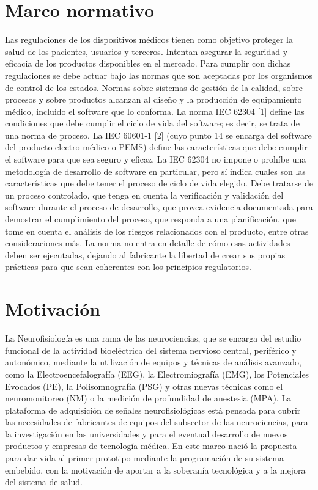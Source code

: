 \section{Marco normativo}
Las regulaciones de los dispositivos médicos tienen como objetivo proteger la salud de los pacientes, usuarios y terceros. Intentan asegurar la seguridad y eficacia de los productos disponibles en el mercado. Para cumplir con dichas regulaciones se debe actuar bajo las normas que son aceptadas por los organismos de control de los estados. Normas sobre sistemas de gestión de la calidad, sobre procesos y sobre productos alcanzan al diseño y la producción de equipamiento médico, incluido el software que lo conforma. La norma IEC 62304 [1] define las condiciones que debe cumplir el ciclo de vida del software; es decir, se trata de una norma de proceso. La IEC 60601-1 [2] (cuyo punto 14 se encarga del software del producto electro-médico o PEMS) define las características que debe cumplir el software para que sea seguro y eficaz. La IEC 62304 no impone o prohíbe una metodología de desarrollo de software en particular, pero sí indica cuales son las características que debe tener el proceso de ciclo de vida elegido. Debe tratarse de un proceso controlado, que tenga en cuenta la verificación y validación del software durante el proceso de desarrollo, que provea evidencia documentada para demostrar el cumplimiento del proceso, que responda a una planificación, que tome en cuenta el análisis de los riesgos relacionados con el producto, entre otras consideraciones más. La norma no entra en detalle de cómo esas actividades deben ser ejecutadas, dejando al fabricante la libertad de crear sus propias prácticas para que sean coherentes con los principios regulatorios.

\section{Motivación}
La Neurofisiología es una rama de las neurociencias, que se encarga del estudio funcional de la actividad bioeléctrica del sistema nervioso central, periférico y autonómico, mediante la utilización de equipos y técnicas de análisis avanzado, como la Electroencefalografía (EEG), la Electromiografía (EMG), los Potenciales Evocados (PE), la Polisomnografía (PSG) y otras nuevas técnicas como el neuromonitoreo (NM) o la medición de profundidad de anestesia (MPA). La plataforma de adquisición de señales neurofisiológicas está pensada para cubrir las necesidades de fabricantes de equipos del subsector de las neurociencias, para la investigación en las universidades y para el eventual desarrollo de nuevos productos y empresas de tecnología médica. En este marco nació la propuesta para dar vida al primer prototipo mediante la programación de su sistema embebido, con la motivación de aportar a la soberanía tecnológica y a la mejora del sistema de salud. 


